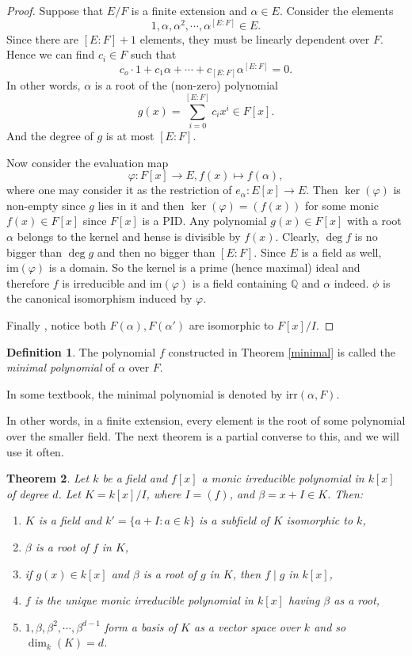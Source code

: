 \documentclass[12pt]{report}
\newtheorem{theorem}{Theorem}[section]
\theoremstyle{definition}
\newtheorem{definition}[theorem]{Definition}
\newcommand{\QQ}{\mathbb{Q}}
\newcommand{\im}{\text{im}}
\begin{document}
\begin{proof}
	Suppose that $E/F$ is a finite extension and $\alpha\in E$. Consider the elements $$1,\alpha,\alpha^2,\cdots,\alpha^{[E:F]}\in E.$$
	Since there are $[E:F]+1$ elements, they must be linearly dependent over $F$. Hence we can find $c_i\in F$ such that $$c_o\cdot 1+c_1\alpha+\cdots+c_{[E:F]}\alpha^{[E:F]} =0.$$  In other words, $\alpha$ is a root of the (non-zero) polynomial $$g(x)=\sum_{i=0}^{[E:F]}c_i x^i \in F[x].$$ And the degree of $g$ is at most $[E:F]$.

	Now consider the evaluation map $$\varphi: F[x]\to E, f(x)\mapsto f(\alpha),$$ where one may consider it as the restriction of $e_\alpha: E[x]\to E$. Then $\ker(\varphi)$ is non-empty since $g$ lies in it and then $\ker(\varphi)=(f(x))$ for some monic $f(x)\in F[x]$ since $F[x]$ is a PID. Any polynomial $g(x)\in F[x]$ with a root $\alpha$ belongs to the kernel and hense is divisible by $f(x)$. Clearly, $\deg f$ is no bigger than $\deg g$ and then no bigger than $[E:F]$. Since $E$ is a field as well, $\im(\varphi)$ is a domain. So the kernel is a prime (hence maximal) ideal and therefore $f$ is irreducible and $\im(\varphi)$ is a field containing $\QQ$ and $\alpha$ indeed. $\phi$ is the canonical isomorphism  induced by $\varphi$.

	Finally , notice both $F(\alpha), F(\alpha')$ are isomorphic to $F[x]/I$.
\end{proof}

\begin{definition}
	The polynomial $f$ constructed in Theorem \ref{minimal} is called the \emph{minimal polynomial} of $\alpha$ over $F$.
\end{definition}

\begin{remark}
	In some textbook, the minimal polynomial is denoted by $\mbox{irr}(\alpha,F)$.
\end{remark}

In other words, in a finite extension, every element is the root of some polynomial over the smaller field. The next theorem is a partial converse to this, and we will use it often.

\begin{theorem}\label{stem}
	Let $k$ be a field and $f[x]$ a monic irreducible polynomial in $k[x]$ of degree $d$. Let $K=k[x]/I$, where $I=(f)$, and $\beta = x+I\in K$. Then:
	\begin{enumerate}
		\item $K$ is a field and $k'=\{a+I: a\in k\}$ is a subfield of $K$ isomorphic to $k$,
		\item $\beta$ is a root of $f$ in $K$,
		\item if $g(x)\in k[x]$ and $\beta$ is a root of $g$ in $K$, then $f\mid g$ in $k[x]$,
		\item $f$ is the unique monic irreducible polynomial in $k[x]$ having $\beta$ as a root,
		\item $1,\beta,\beta^2,\cdots,\beta^{d-1}$ form a basis of $K$ as a vector space over $k$ and so $\dim_k(K)=d$.
	\end{enumerate}
\end{theorem}
\end{document}
